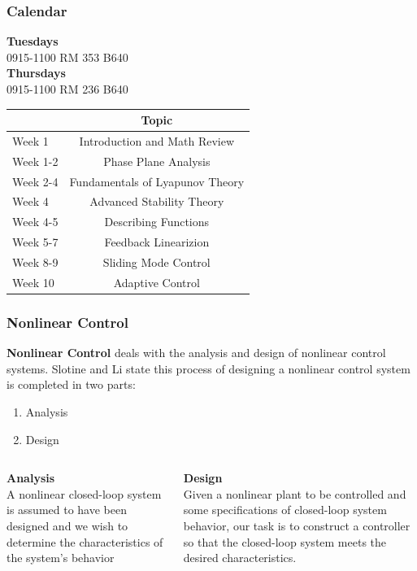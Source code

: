 \documentclass[show notes]{beamer}       %
\begin{document}
\begin{frame}
\frametitle{Calendar}
\textbf{Tuesdays}\\
0915-1100 RM 353 B640\\
\textbf{Thursdays}\\
0915-1100 RM 236 B640\\
\begin{table}
\centering
    \begin{tabular}{l  c}
    \hline
     & Topic \\ \hline
    Week 1 & Introduction and Math Review\\
    Week 1-2 & Phase Plane Analysis\\
    Week 2-4 & Fundamentals of Lyapunov Theory\\
    Week 4   & Advanced Stability Theory\\
    Week 4-5 & Describing Functions \\
    Week 5-7 & Feedback Linearizion \\ 
    Week 8-9 & Sliding Mode Control \\
    Week 10  & Adaptive Control \\\hline
    \end{tabular}
\end{table}
\end{frame}
 
\begin{frame}
\frametitle{Nonlinear Control}
\textbf{Nonlinear Control} deals with the analysis and design of nonlinear control systems. Slotine and Li state this process of designing a nonlinear control system is completed in two parts:
\begin{enumerate}
\item Analysis
\item Design
\end{enumerate}

\begin{columns}[T] %
\begin{column}{.48\textwidth}
\textbf{Analysis}\\ 
A nonlinear closed-loop system is assumed to have been designed and we wish to determine the characteristics of the system's behavior 
\end{column}%
\hfill%
\begin{column}{.48\textwidth}
\textbf{Design}\\ 
Given a nonlinear plant to be controlled and some specifications of closed-loop system behavior, our task is to construct a controller so that the closed-loop system meets the desired characteristics.
\end{column}%
\end{columns}
\end{frame}
\end{document}
